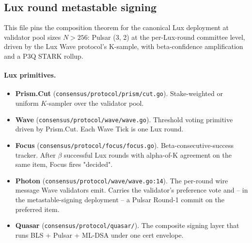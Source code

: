 
\subsection*{Lux round metastable signing}

This file pins the composition theorem for the canonical Lux
deployment at validator pool sizes $N > 256$: Pulsar (3, 2) at the
per-Lux-round committee level, driven by the Lux Wave protocol's
K-sample, with beta-confidence amplification and a P3Q STARK rollup.

\paragraph{Lux primitives.}
\begin{itemize}[leftmargin=*, itemsep=0pt]
\item \textbf{Prism.Cut}
(\texttt{consensus/protocol/prism/cut.go}). Stake-weighted or
uniform $K$-sampler over the validator pool.
\item \textbf{Wave} (\texttt{consensus/protocol/wave/wave.go}).
Threshold voting primitive driven by Prism.Cut. Each Wave Tick is
one Lux round.
\item \textbf{Focus} (\texttt{consensus/protocol/focus/focus.go}).
Beta-consecutive-success tracker. After $\beta$ successful Lux
rounds with alpha-of-K agreement on the same item, Focus fires
"decided".
\item \textbf{Photon} (\texttt{consensus/protocol/wave/wave.go:14}).
The per-round wire message Wave validators emit. Carries the
validator's preference vote and -- in the metastable-signing
deployment -- a Pulsar Round-1 commit on the preferred item.
\item \textbf{Quasar} (\texttt{consensus/protocol/quasar/}).
The composite signing layer that runs BLS + Pulsar + ML-DSA
under one cert envelope.
\end{itemize}

